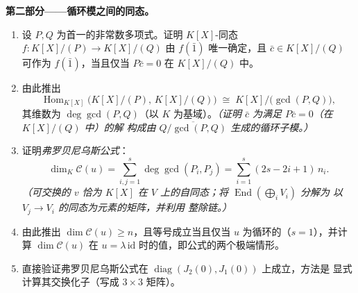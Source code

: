 \begin{problem}
\medskip
\noindent\textbf{第二部分——循环模之间的同态。}
\begin{enumerate}[resume]
  \item 设 $P, Q$ 为首一的非常数多项式。证明
        $K[X]$-同态 $f \colon K[X]/(P) \to K[X]/(Q)$
        由 $f(\bar 1)$ 唯一确定，且 $\bar c \in K[X]/(Q)$
        可作为 $f(\bar 1)$，当且仅当 $P\bar c = 0$ 在 $K[X]/(Q)$ 中。
  \item 由此推出
        \[
        \operatorname{Hom}_{K[X]}\bigl(K[X]/(P),\, K[X]/(Q)\bigr)
        \;\cong\; K[X]\big/\bigl(\gcd(P, Q)\bigr),
        \]
        其维数为 $\deg \gcd(P, Q)$（以 $K$ 为基域）。\emph{（证明
        $\bar c$ 为满足 $P\bar c = 0$（在 $K[X]/(Q)$ 中）的解
        构成由
        $\overline{Q/\gcd(P,Q)}$ 生成的循环子模。）}
  \item 证明\emph{弗罗贝尼乌斯公式}：
        \[
        \dim_K \mathcal C(u) = \sum_{i,j=1}^{s} \deg\gcd(P_i,
        P_j) = \sum_{i=1}^{s} (2s - 2i + 1)\, n_i .
        \]
        \emph{（可交换的 $v$ 恰为 $K[X]$ 在
        $V$ 上的自同态；将 $\operatorname{End}(\bigoplus_i V_i)$ 分解为
        以 $V_j \to V_i$ 的同态为元素的矩阵，并利用
        整除链。）}
  \item 由此推出 $\dim \mathcal C(u) \geq n$，且等号成立当且仅当 $u$
        为循环的（$s = 1$），并计算 $\dim\mathcal C(u)$
        在 $u = \lambda\,\mathrm{id}$ 时的值，即公式的两个极端情形。
  \item 直接验证弗罗贝尼乌斯公式在
        $\operatorname{diag}(J_2(0), J_1(0))$ 上成立，方法是
        显式计算其交换化子（写成 $3\times3$ 矩阵）。
\end{enumerate}


\end{problem}
